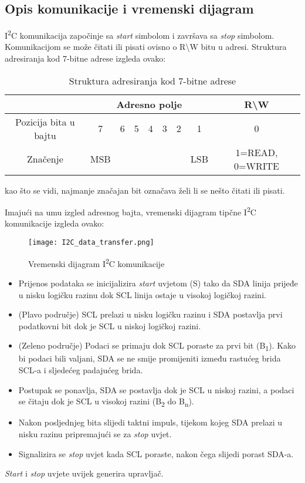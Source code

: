 \subsection{Opis komunikacije i vremenski dijagram}
I\textsuperscript{2}C komunikacija započinje sa \textit{start} simbolom i završava sa \textit{stop} simbolom. Komunikacijom se može čitati ili pisati ovisno o R\textbackslash W bitu u adresi. Struktura adresiranja kod 7-bitne adrese izgleda ovako:
\begin{center}
	\begin{table}
		\begin{tabular}{ | c | c | c | c | c | c | c | c | c | }
			\hline
			& \multicolumn{7}{|c|}{Adresno polje} & R\textbackslash W \\
			\hline
			Pozicija bita u bajtu & 7 & 6 & 5 & 4 & 3 & 2 & 1 & 0 \\
			\hline
			Značenje & MSB & \multicolumn{5}{|c|}{} & LSB & 1=READ, 0=WRITE \\
			\hline
		\end{tabular}
		\caption{Struktura adresiranja kod 7-bitne adrese \cite{i2c_wikipedia}}
	\end{table}
\end{center}
kao što se vidi, najmanje značajan bit označava želi li se nešto čitati ili pisati.

Imajući na umu izgled adresnog bajta, vremenski dijagram tipčne
I\textsuperscript{2}C komunikacije izgleda ovako:
\begin{figure}[hp]
	\centering
	\texttt{[image: I2C\_data\_transfer.png]}
	\caption{Vremenski dijagram I\textsuperscript{2}C komunikacije
	\cite{i2c_wikipedia}}
	\label{fig:i2c_timing_diagram}
\end{figure}
\begin{itemize}
	\item Prijenos podataka se inicijalizira \textit{start} uvjetom (S) tako da
	SDA linija prijeđe u nisku logičku razinu dok SCL linija ostaje u visokoj
	logičkoj razini.
	\item (Plavo područje) SCL prelazi u nisku logičku razinu i SDA postavlja
	prvi podatkovni bit dok je SCL u niskoj logičkoj razini.
	\item (Zeleno područje) Podaci se primaju dok SCL poraste za prvi bit
	(B\textsubscript{1}). Kako bi podaci bili valjani, SDA se ne smije
	promijeniti između rastućeg brida SCL-a i sljedećeg padajućeg brida.
	\item Postupak se ponavlja, SDA se postavlja dok je SCL u niskoj razini, a
	podaci se čitaju dok je SCL u visokoj razini (B\textsubscript{2} do
	B\textsubscript{n}).
	\item Nakon posljednjeg bita slijedi taktni impuls, tijekom kojeg SDA
	prelazi u nisku razinu pripremajući se za \textit{stop} uvjet.
	\item Signalizira se \textit{stop} uvjet kada SCL poraste, nakon čega
	slijedi porast SDA-a.
\end{itemize}
\textit{Start} i \textit{stop} uvjete uvijek generira upravljač.

